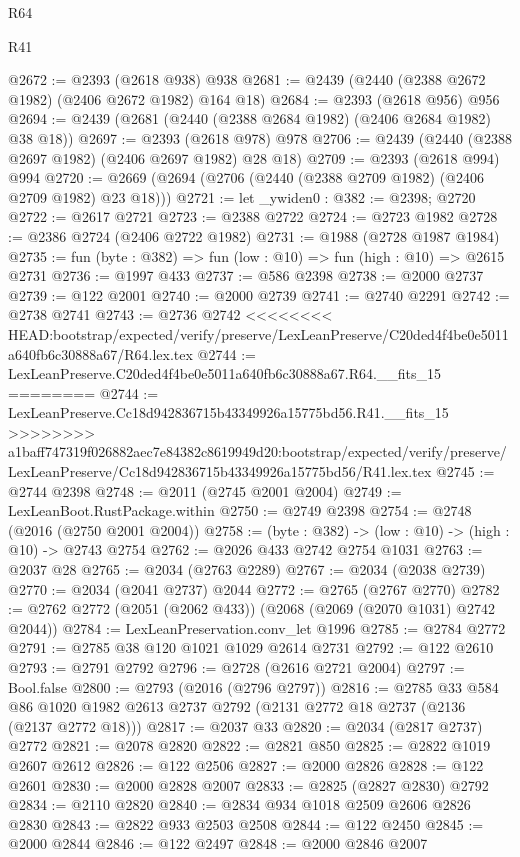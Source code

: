 \begin{lexlean}{R64}
\begin{lexlean}{R41}
\begin{coremodule}
{{{{{{{{{{{{{{{{{{{{{{{{{{{{{{{{{{{{{{{{{{{{{{{{{{{{{{{{{{{{{{{{{{{{{{{{{{{{{{{{{{{{{{{{{@2672 := @2393 (@2618 @938) @938
@2681 := @2439 (@2440 (@2388 @2672 @1982) (@2406 @2672 @1982) @164 @18)
@2684 := @2393 (@2618 @956) @956
@2694 := @2439 (@2681 (@2440 (@2388 @2684 @1982) (@2406 @2684 @1982) @38 @18))
@2697 := @2393 (@2618 @978) @978
@2706 := @2439 (@2440 (@2388 @2697 @1982) (@2406 @2697 @1982) @28 @18)
@2709 := @2393 (@2618 @994) @994
@2720 := @2669 (@2694 (@2706 (@2440 (@2388 @2709 @1982) (@2406 @2709 @1982) @23 @18)))
@2721 := let _ywiden0 : @382 := @2398; @2720
@2722 := @2617 @2721
@2723 := @2388 @2722
@2724 := @2723 @1982
@2728 := @2386 @2724 (@2406 @2722 @1982)
@2731 := @1988 (@2728 @1987 @1984)
@2735 := fun (byte : @382) => fun (low : @10) => fun (high : @10) => @2615 @2731
@2736 := @1997 @433
@2737 := @586 @2398
@2738 := @2000 @2737
@2739 := @122 @2001
@2740 := @2000 @2739
@2741 := @2740 @2291
@2742 := @2738 @2741
@2743 := @2736 @2742
<<<<<<<< HEAD:bootstrap/expected/verify/preserve/LexLeanPreserve/C20ded4f4be0e5011a640fb6c30888a67/R64.lex.tex
@2744 := LexLeanPreserve.C20ded4f4be0e5011a640fb6c30888a67.R64.__fits_15
========
@2744 := LexLeanPreserve.Cc18d942836715b43349926a15775bd56.R41.__fits_15
>>>>>>>> a1baff747319f026882aec7e84382c8619949d20:bootstrap/expected/verify/preserve/LexLeanPreserve/Cc18d942836715b43349926a15775bd56/R41.lex.tex
@2745 := @2744 @2398
@2748 := @2011 (@2745 @2001 @2004)
@2749 := LexLeanBoot.RustPackage.within
@2750 := @2749 @2398
@2754 := @2748 (@2016 (@2750 @2001 @2004))
@2758 := (byte : @382) -> (low : @10) -> (high : @10) -> @2743 @2754
@2762 := @2026 @433 @2742 @2754 @1031
@2763 := @2037 @28
@2765 := @2034 (@2763 @2289)
@2767 := @2034 (@2038 @2739)
@2770 := @2034 (@2041 @2737) @2044
@2772 := @2765 (@2767 @2770)
@2782 := @2762 @2772 (@2051 (@2062 @433)) (@2068 (@2069 (@2070 @1031) @2742 @2044))
@2784 := LexLeanPreservation.conv_let @1996
@2785 := @2784 @2772
@2791 := @2785 @38 @120 @1021 @1029 @2614 @2731
@2792 := @122 @2610
@2793 := @2791 @2792
@2796 := @2728 (@2616 @2721 @2004)
@2797 := Bool.false
@2800 := @2793 (@2016 (@2796 @2797))
@2816 := @2785
    @33
    @584
    @86
    @1020
    @1982
    @2613
    @2737
    @2792
    (@2131 @2772 @18 @2737 (@2136 (@2137 @2772 @18)))
@2817 := @2037 @33
@2820 := @2034 (@2817 @2737) @2772
@2821 := @2078 @2820
@2822 := @2821 @850
@2825 := @2822 @1019 @2607 @2612
@2826 := @122 @2506
@2827 := @2000 @2826
@2828 := @122 @2601
@2830 := @2000 @2828 @2007
@2833 := @2825 (@2827 @2830) @2792
@2834 := @2110 @2820
@2840 := @2834 @934 @1018 @2509 @2606 @2826 @2830
@2843 := @2822 @933 @2503 @2508
@2844 := @122 @2450
@2845 := @2000 @2844
@2846 := @122 @2497
@2848 := @2000 @2846 @2007
}}}}}}}}}}}}}}}}}}}}}}}}}}}}}}}}}}}}}}}}}}}}}}}}}}}}}}}}}}}}}}}}}}}}}}}}}}}}}}}}}}}}}}}}}
\end{coremodule}
\end{lexlean}
\end{lexlean}
